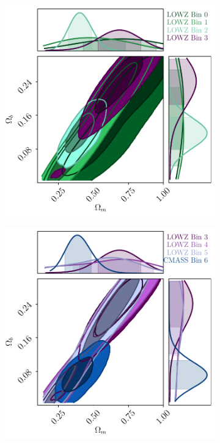 \begin{figure}
\begin{subfigure}{.5\textwidth}
  \centering
  \includegraphics[width=\columnwidth]{BOSS-FIGS/LOWZ_SINGLE_BIN_1.pdf}
  \caption{}
\end{subfigure}%
\begin{subfigure}{.5\textwidth}
  \centering
  \includegraphics[width=\columnwidth]{BOSS-FIGS/LOWZ_SINGLE_BIN_2.pdf}

\end{subfigure}
\end{figure}
